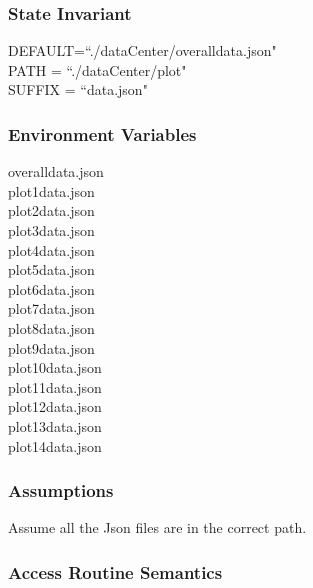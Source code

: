 \documentclass[12pt, titlepage]{article}
\begin{document}
\subsubsection{State Invariant}
DEFAULT=``./dataCenter/overalldata.json"\\
PATH = ``./dataCenter/plot"\\
SUFFIX = ``data.json"
\subsubsection{Environment Variables}
overalldata.json\\
plot1data.json\\
plot2data.json\\
plot3data.json\\
plot4data.json\\
plot5data.json\\
plot6data.json\\
plot7data.json\\
plot8data.json\\
plot9data.json\\
plot10data.json\\
plot11data.json\\
plot12data.json\\
plot13data.json\\
plot14data.json

\subsubsection{Assumptions}

Assume all the Json files are in the correct path.

\subsubsection{Access Routine Semantics}
\end{document}
